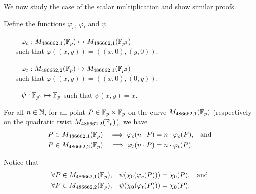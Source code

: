 We now study the case of the scalar multiplication and show similar proofs.
\begin{dfn}
  Define the functions $\varphi_c$, $\varphi_t$ and $\psi$
  \begin{itemize}
    \item[--] $\varphi_c: M_{486662,1}(\mathbb{F}_{p}) \mapsto M_{486662,1}(\mathbb{F}_{p^2})$\\
          such that $\varphi((x,y)) = ((x,0), (y,0))$.
    \item[--] $\varphi_t: M_{486662,2}(\mathbb{F}_{p}) \mapsto M_{486662,1}(\mathbb{F}_{p^2})$\\
          such that $\varphi((x,y)) = ((x,0), (0,y))$.
    \item[--] $\psi: \mathbb{F}_{p^2} \mapsto \mathbb{F}_{p}$ such that $\psi(x,y) = x$.
  \end{itemize}
\end{dfn}

\begin{lemma}
  \label{lemma:proj}
  For all $n \in \mathbb{N}$, for all point $P\in\mathbb{F}_{p}\times\mathbb{F}_{p}$ on the curve
  $M_{486662,1}(\mathbb{F}_{p})$ (respectively on the quadratic twist $M_{486662,2}(\mathbb{F}_{p})$), we have
  \begin{align*}
    P & \in M_{486662,1}(\mathbb{F}_{p}) & \implies \varphi_c(n \cdot P) & = n \cdot \varphi_c(P), &  & \text{and} \\
    P & \in M_{486662,2}(\mathbb{F}_{p}) & \implies \varphi_t(n \cdot P) & = n \cdot \varphi_t(P).
  \end{align*}
\end{lemma}
Notice that
\begin{align*}
  \forall P \in M_{486662,1}(\mathbb{F}_{p}), &  & \psi(\chi_0(\varphi_c(P))) & = \chi_0(P), &  & \text{and} \\
  \forall P \in M_{486662,2}(\mathbb{F}_{p}), &  & \psi(\chi_0(\varphi_t(P))) & = \chi_0(P).
\end{align*}

